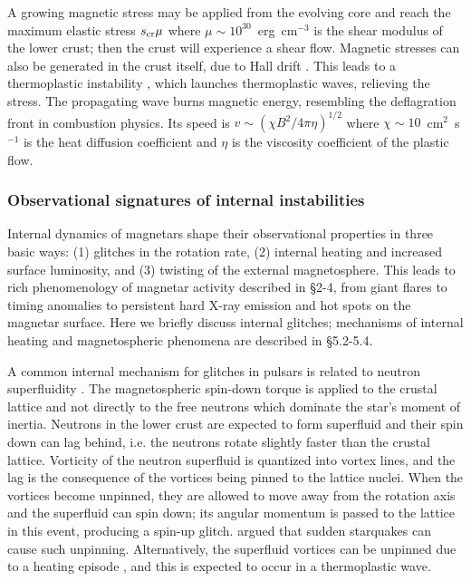 A growing magnetic stress may be applied from the evolving core and 
reach the maximum elastic stress $s_{\rm cr}\mu$
where $\mu\sim 10^{30}$~erg~cm$^{-3}$ is the shear modulus of the lower crust;
then the crust will experience a shear flow.
Magnetic stresses can also be generated in the crust itself, due to Hall drift \citep{td96a,pp11}.
This leads to a thermoplastic instability \citep{bl14}, which 
launches thermoplastic waves, relieving the stress.
The propagating wave burns magnetic energy, resembling the deflagration front in combustion physics. Its speed is 
$v\sim (\chi B^2/4\pi \eta)^{1/2}$ where $\chi\sim 10$~cm$^2$~s$^{-1}$ is the heat 
diffusion coefficient and $\eta$ is the viscosity coefficient of the plastic flow.


\subsubsection{Observational signatures of internal instabilities}


Internal dynamics of magnetars shape their observational properties in three basic ways:
(1) glitches in the rotation rate, (2) internal heating and increased surface luminosity,
and (3) twisting of the external magnetosphere. This leads to 
rich phenomenology of magnetar activity described in \S2-4,
from giant flares to timing anomalies to persistent hard X-ray 
emission and hot spots on the magnetar surface.
Here we briefly discuss internal glitches; mechanisms of internal heating and 
magnetospheric phenomena are described in \S5.2-5.4.

A common internal mechanism for glitches in pulsars is related to neutron superfluidity
\citep{ai75}. The magnetospheric spin-down torque is applied to the crustal lattice 
and not directly to the free neutrons which dominate the star's moment of inertia. 
Neutrons in the lower crust are expected to form superfluid and their spin down
can lag behind, i.e. the neutrons rotate slightly faster than the crustal lattice. 
Vorticity of the neutron superfluid is quantized into vortex lines, and the lag 
is the consequence of the vortices being pinned to the lattice nuclei.
When the vortices become unpinned, they are allowed 
to move away from the rotation axis and the superfluid can spin down;
its angular momentum is passed to the lattice in this event, producing a spin-up glitch.
\citet{td96a} argued that sudden starquakes can cause such unpinning.
Alternatively, the superfluid vortices can be unpinned due to a 
heating episode \citep{le95}, and this is expected to occur in a 
thermoplastic wave. 


